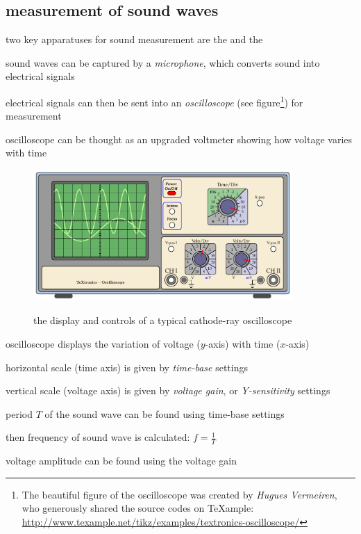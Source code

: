 \subsection*{measurement of sound waves}

two key apparatuses for sound measurement are the  and the  

sound waves can be captured by a \emph{microphone}, which converts sound into electrical signals

electrical signals can then be sent into an \emph{oscilloscope} (see figure\footnote{The beautiful figure of the oscilloscope was created by \emph{Hugues Vermeiren}, who generously shared the source codes on TeXample: \url{http://www.texample.net/tikz/examples/textronics-oscilloscope/}}) for measurement

oscilloscope can be thought as an upgraded voltmeter showing how voltage varies with time

\begin{figure}[ht]
	\centering
	\includegraphics*[width=0.88\textwidth]{oscilloscope.pdf}
	
	the display and controls of a typical cathode-ray oscilloscope
\end{figure}

\cmt oscilloscope displays the variation of voltage ($y$-axis) with time ($x$-axis)

\cmt horizontal scale (time axis) is given by \emph{time-base} settings

vertical scale (voltage axis) is given by \emph{voltage gain}, or \emph{Y-sensitivity} settings

\cmt period $T$ of the sound wave can be found using time-base settings

then frequency of sound wave is calculated: $f=\frac{1}{T}$

\cmt voltage amplitude can be found using the voltage gain


